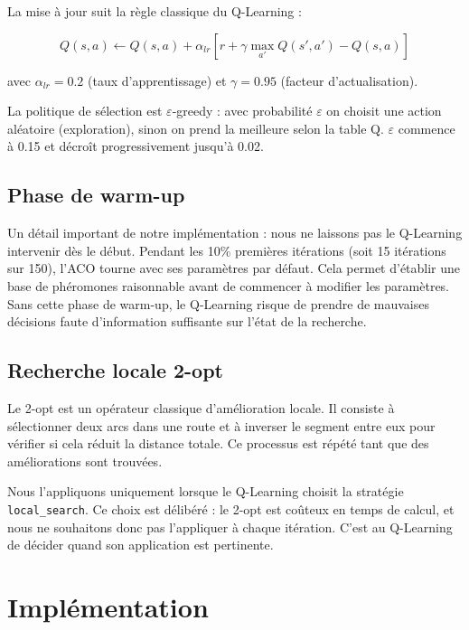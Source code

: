 \documentclass[12pt, a4paper]{article}
\begin{document}
La mise à jour suit la règle classique du Q-Learning :

\begin{equation}
    Q(s, a) \leftarrow Q(s, a) + \alpha_{lr} \left[ r + \gamma \max_{a'} Q(s', a') - Q(s, a) \right]
\end{equation}

avec $\alpha_{lr} = 0.2$ (taux d'apprentissage) et $\gamma = 0.95$ (facteur d'actualisation).

La politique de sélection est $\varepsilon$-greedy : avec probabilité $\varepsilon$ on choisit une action aléatoire (exploration), sinon on prend la meilleure selon la table Q. $\varepsilon$ commence à 0.15 et décroît progressivement jusqu'à 0.02.

\subsection{Phase de warm-up}

Un détail important de notre implémentation : nous ne laissons pas le Q-Learning intervenir dès le début. Pendant les 10\% premières itérations (soit 15 itérations sur 150), l'ACO tourne avec ses paramètres par défaut. Cela permet d'établir une base de phéromones raisonnable avant de commencer à modifier les paramètres. Sans cette phase de warm-up, le Q-Learning risque de prendre de mauvaises décisions faute d'information suffisante sur l'état de la recherche.

\subsection{Recherche locale 2-opt}

Le 2-opt est un opérateur classique d'amélioration locale. Il consiste à sélectionner deux arcs dans une route et à inverser le segment entre eux pour vérifier si cela réduit la distance totale. Ce processus est répété tant que des améliorations sont trouvées.

Nous l'appliquons uniquement lorsque le Q-Learning choisit la stratégie \texttt{local\_search}. Ce choix est délibéré : le 2-opt est coûteux en temps de calcul, et nous ne souhaitons donc pas l'appliquer à chaque itération. C'est au Q-Learning de décider quand son application est pertinente.

\section{Implémentation}
\end{document}
